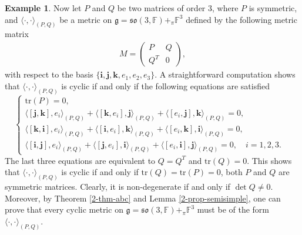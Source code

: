 \documentclass[reqno]{amsart}
\theoremstyle{definition}
\newtheorem{example}[thm]{Example}
\begin{document}
\begin{example}
Now let $P$ and $Q$ be two   matrices of order 3, where $P$ is symmetric, and
$\langle\cdot,\cdot\rangle_{(P,Q)}$ be a   metric on $\mathfrak{g}=\mathfrak{so}(3,\mathbb{F})+_{\pi}\mathbb{F}^{3}$ defined by the following metric matrix
\begin{eqnarray*}
M=
\left(\begin{array}{cc}
P & Q \\
Q^{T} & 0
\end{array}\right),
\end{eqnarray*}
with respect to the basis $\{\mathbf{i},\mathbf{j},\mathbf{k},e_{1},e_{2},e_{3}\}$.
A straightforward computation shows that $\langle\cdot,\cdot\rangle_{(P,Q)}$ is cyclic if and only if  the following equations are satisfied
$$\left\{
  \begin{array}{ll}
  \mathrm{tr}(P)=0,&\\
\langle[\mathbf{j},\mathbf{k}],e_{i}\rangle_{(P,Q)}+\langle[\mathbf{k},e_{i}],\mathbf{j}\rangle_{(P,Q)}+ \langle[e_{i},\mathbf{j}],\mathbf{k}\rangle_{(P,Q)}=0, &  \\
\langle[\mathbf{k},\mathbf{i}],e_{i}\rangle_{(P,Q)}+\langle[\mathbf{i},e_{i}],\mathbf{k}\rangle_{(P,Q)}+ \langle[e_{i},\mathbf{k}],\mathbf{i}\rangle_{(P,Q)}=0, &  \\
\langle[\mathbf{i},\mathbf{j}],e_{i}\rangle_{(P,Q)}+\langle[\mathbf{j},e_{i}],\mathbf{i}\rangle_{(P,Q)}+ \langle[e_{i},\mathbf{i}],\mathbf{j}\rangle_{(P,Q)}=0,\quad i=1,2,3. &
  \end{array}
\right. $$
The last three equations are equivalent to
$Q=Q^{T}$ and $\mathrm{tr}(Q)=0$.
This shows that $\langle\cdot,\cdot\rangle_{(P,Q)}$ is cyclic if and only if
$\mathrm{tr}(Q)=\mathrm{tr}(P)=0$, both $P$ and $Q$ are symmetric matrices.
Clearly,  it is non-degenerate if and only if $\det Q\neq0$.
Moreover, by Theorem \ref{2-thm-abc} and Lemma \ref{2-prop-semisimple}, one can prove that every cyclic metric on $\mathfrak{g}=\mathfrak{so}(3,\mathbb{F})+_{\pi}\mathbb{F}^{3}$ must be of the form $\langle\cdot,\cdot\rangle_{(P,Q)}$.
\end{example}
\end{document}
